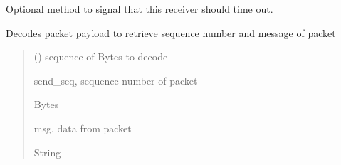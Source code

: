 \documentclass[letterpaper,10pt,oneside,english,openany]{sphinxmanual}
\begin{document}
\begin{fulllineitems}
\begin{fulllineitems}
\label{\detokenize{modules:receiver_rdt.Receiver.set_timeout}}
\pysigstartsignatures
\pysiglinewithargsret
{}
{}
{}
\pysigstopsignatures
\sphinxAtStartPar
Optional method to signal that this receiver should time out.

\end{fulllineitems}


\begin{fulllineitems}
\label{\detokenize{modules:receiver_rdt.Receiver.timeout}}
\pysigstartsignatures
\pysigline
{}
\pysigstopsignatures
\end{fulllineitems}


\end{fulllineitems}


\begin{fulllineitems}
\label{\detokenize{modules:receiver_rdt.convert_sender_payload}}
\pysigstartsignatures
\pysiglinewithargsret
{}
{}
{}
\pysigstopsignatures
\sphinxAtStartPar
Decodes packet payload to retrieve sequence number and message of packet
\begin{quote}\begin{description}
\sphinxAtStartPar
{} () \textendash{} sequence of Bytes to decode

\sphinxAtStartPar
send\_seq, sequence number of packet

\sphinxAtStartPar
Bytes

\sphinxAtStartPar
msg, data from packet

\sphinxAtStartPar
String

\end{description}\end{quote}

\end{fulllineitems}
\end{document}
